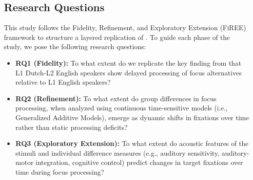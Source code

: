 \subsection{Research Questions}

This study follows the Fidelity, Refinement, and Exploratory Extension (FiREE) framework to structure a layered replication of \textcite{ge2021a}. To guide each phase of the study, we pose the following research questions:

\begin{itemize}
    \item \textbf{RQ1 (Fidelity):} To what extent do we replicate the key finding from \textcite{ge2021a} that L1 Dutch-L2 English speakers show delayed processing of focus alternatives relative to L1 English speakers?
    
    \item \textbf{RQ2 (Refinement):} To what extent do group differences in focus processing, when analyzed using continuous time-sensitive models (i.e., Generalized Additive Models), emerge as dynamic shifts in fixations over time rather than static processing deficits?
    
    \item \textbf{RQ3 (Exploratory Extension):} To what extent do acoustic features of the stimuli and individual difference measures (e.g., auditory sensitivity, auditory-motor integration, cognitive control) predict changes in target fixations over time during focus processing?
\end{itemize}
